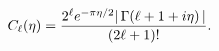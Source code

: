 \[\mathop{C_{\ell}\/}\nolimits\!\left(\eta\right)=\frac{2^{\ell}e^{-\pi\eta/2}|%
\mathop{\Gamma\/}\nolimits\!\left(\ell+1+i\eta\right)|}{(2\ell+1)!}.\]